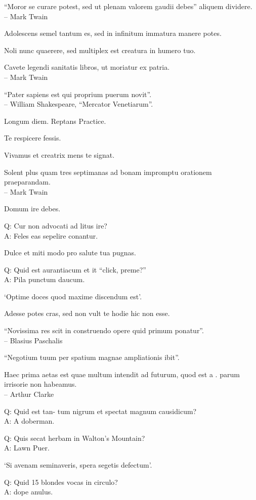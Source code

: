 \documentclass[titlepage,12pt]{memoir}
\begin{document}
“Moror se curare potest, sed ut plenam valorem gaudii debes”
aliquem dividere.
\\-- Mark Twain

Adolescens semel tantum es, sed in infinitum immatura manere potes.

Noli nunc quaerere, sed multiplex est creatura in humero tuo.

Cavete legendi sanitatis libros, ut moriatur ex patria.
\\-- Mark Twain

“Pater sapiens est qui proprium puerum novit”.
\\-- William Shakespeare, “Mercator Venetiarum”.

Longum diem. Reptans Practice.

Te respicere fessis.

Vivamus et creatrix mens te signat.

Solent plus quam tres septimanas ad bonam impromptu orationem praeparandam.
\\-- Mark Twain

Domum ire debes.

Q: Cur non advocati ad litus ire?\\
A: Feles eas sepelire conantur.

Dulce et miti modo pro salute tua pugnas.

Q: Quid est aurantiacum et it “click, preme?”\\
A: Pila punctum daucum.

‘Optime doces quod maxime discendum est’.

Adesse potes cras, sed non vult te hodie hic non esse.

“Novissima res scit in construendo opere quid primum ponatur”.
\\-- Blasius Paschalis

“Negotium tuum per spatium magnae ampliationis ibit”.

Haec prima aetas est quae multum intendit ad futurum, quod est a .
parum irrisorie non habeamus.
\\-- Arthur Clarke

Q: Quid est tan- tum nigrum et spectat magnum causidicum?\\
A: A doberman.

Q: Quis secat herbam in Walton’s Mountain?\\
A: Lawn Puer.

‘Si avenam seminaveris, spera segetis defectum’.

Q: Quid 15 blondes vocas in circulo?\\
A: dope anulus.
\end{document}
